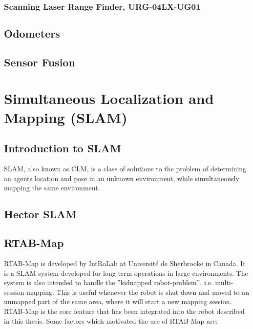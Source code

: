 \subsubsection{Scanning Laser Range Finder, URG-04LX-UG01}


\subsection{Odometers}

\subsection{Sensor Fusion}


\section{Simultaneous Localization and Mapping (SLAM)}

\subsection{Introduction to SLAM}

\ac{SLAM}, also known as \ac{CLM}, is a class of solutions to the problem of determining an agents location and pose in an unknown environment, while simultaneously mapping the same environment.

\subsection{Hector SLAM}

\subsection{RTAB-Map}
\label{sec:RTAB-Map}

\ac{RTAB-Map} is developed by IntRoLab at Université de Sherbrooke in Canada. It is a \ac{SLAM} system developed for long term operations in large environments. The system is also intended to handle the ''kidnapped robot-problem'', i.e. multi-session mapping. This is useful whenever the robot is shut down and moved to an unmapped part of the same area, where it will start a new mapping session. \ac{RTAB-Map} is the core feature that has been integrated into the robot described in this thesis. Some factors which motivated the use of \ac{RTAB-Map} are:

